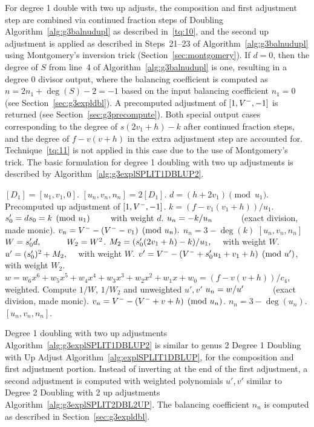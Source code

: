 For degree 1 double with two up adjusts, the composition and first adjustment
step are combined via continued
fraction steps of Doubling Algorithm~\ref{alg:g3balnudupl} as described
in~\ref{tq:10}, and the second up adjustment is applied as described in
Steps~21--23 of Algorithm~\ref{alg:g3balnudupl} using Montgomery's inversion
trick (Section~\ref{sec:montgomery}). If $d = 0$, then the degree of $S$ from
line~4 of Algorithm~\ref{alg:g3balnudupl} is one, resulting in a degree 0
divisor output, where the balancing coefficient is computed as $n = 2n_1 + \deg(S)
- 2 = -1$ based on the input balancing coefficient $n_1 = 0$ (see
Section~\ref{sec:g3expldbl}). A precomputed adjustment of $[1,V^{-},-1]$ is
returned (see Section~\ref{sec:g3precompute}). Both special output cases
corresponding to the degree of $s(2v_1 + h) - k$ after continued fraction steps,
and the degree of $f - v(v +h)$ in the extra adjustment step are accounted for.
Technique~\ref{tq:11} is not applied in this case due to the use of Montgomery's
trick. The basic formulation for degree 1 doubling with two up adjustments is
described by Algorithm~\ref{alg:g3explSPLIT1DBLUP2}.

\begin{algorithm}[htbp]
\caption{Genus 3 Split Model Degree 1 Doubling with Two Up Adjusts \label{alg:g3explSPLIT1DBLUP2}}
\begin{algorithmic} [1]
\Require $[D_1] = [u_1,v_1,0]$.  \smallskip
\Ensure $[u_n,v_n,n_n] = 2[D_1]$.
\algrule
\State
\State $d = (h + 2v_1) \pmod{u_1}$.
 \Return Precomputed up adjustment of $[1,V^{-},-1]$.
\EndIf
\State $k = (f - v_1(v_1 + h))/u_1$.
\State $s_0' = ds_0 = k \pmod{u_1} \quad\quad$ with weight $d$.
    \State $u_n = -k/u_n \quad\quad\quad$ (exact division, made monic).
    \State $v_n = V^{-} - (V^{-} - v_1)  \pmod{u_n}.$
    \State $n_n = 3 - \deg(k)$
    \State \Return $[u_n,v_n,n_n]$
\EndIf
\State $W = s_0'd, \quad\quad\quad W_2 = W^2$.
\State $M_2 = (s_0'(2v_1 + h)- k)/u_1, \quad$ with weight $W$.
\State $u' = (s_0')^2 + M_2, \quad $ with weight $W$.
\State $v' = V^{-} - (V^{-} + s_0'u_1 + v_1 + h) \pmod{u'}$, with weight $W_2$.
\State $w = w_6x^6 + w_5x^5 + w_4x^4 + w_3x^3 + w_2x^2 +w_1x + w_0 = (f - v(v + h))/c_4$, weighted.
\State Compute $1/W$, $1/W_2$ and unweighted $u',v'$
\State $u_n = w/u' \quad\quad\quad$ (exact division, made monic).
\State $v_n = V^{-} - (V^{-} + v + h) \pmod{u_n}$.
\State $n_n = 3 - \deg(u_n)$.
\State \Return $[u_n,v_n,n_n]$.
\end{algorithmic}
\end{algorithm}
Degree 1 doubling with two up adjustments Algorithm~\ref{alg:g3explSPLIT1DBLUP2}
is similar to genus 2 Degree 1 Doubling with Up Adjust
Algorithm~\ref{alg:explSPLIT1DBLUP}, for the composition and first adjustment
portion. Instead of inverting at the end of the first adjustment, a second
adjustment is computed with weighted polynomials $u',v'$ similar to Degree 2
Doubling with 2 up adjustments Algorithm~\ref{alg:g3explSPLIT2DBL2UP}. The
balancing coefficient $n_n$ is computed as described in
Section~\ref{sec:g3expldbl}.


